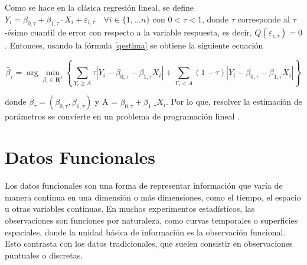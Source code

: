 
\begin{obs}
    Como se hace en la clásica regresión lineal, se define $Y_i=\beta_{0, \tau}+\beta_{1, \tau} \cdot X_i+\varepsilon_{i, \tau} \quad \forall i \in\{1, \dots n\}$ con $0 < \tau < 1$, donde $\tau$ corresponde al $\tau$-ésimo cuantil de error con respecto a la variable respuesta, es decir, $Q(\varepsilon_{i, \tau}) = 0$. Entonces, usando la fórmula \eqref{qestima} se obtiene la siguiente ecuación

    \begin{equation}
        \hat{\beta}_\tau=\arg \min _{\beta_\tau \in \mathbf{R}^2}\left\{\sum_{Y_i \geq A} \tau \left|Y_i-\beta_{0, \tau}-\beta_{1, \tau} X_i\right|+\sum_{Y_i<A}(1-\tau) \left|Y_i-\beta_{0, \tau}-\beta_{1, \tau}  X_i\right|\right\}
    \end{equation}

    donde $\beta_\tau = (\beta_{0, \tau}, \beta_{1, \tau} )$ y A = $\beta_{0, \tau} + \beta_{1, \tau}X_i $. Por lo que, resolver la estimación de parámetros se convierte en un problema de programación lineal \cite{RegLinealCuantil}.
\end{obs}


\section{Datos Funcionales}

Los datos funcionales son una forma de representar información que varía de manera continua en una dimensión o más dimensiones, como el tiempo, el espacio u otras variables continuas. En muchos experimentos estadísticos, las observaciones son funciones por naturaleza, como curvas temporales o superficies espaciales, donde la unidad básica de información es la observación funcional. Esto contrasta con los datos tradicionales, que suelen consistir en observaciones puntuales o discretas.

